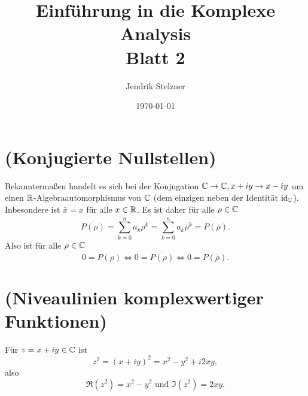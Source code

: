 \documentclass[a4paper,10pt]{article}
\title{\sc Einführung in die Komplexe Analysis \\ \Large Blatt 2}
\author{Jendrik Stelzner}
\date{\today}
\begin{document}
\maketitle





\section{(Konjugierte Nullstellen)}
Bekanntermaßen handelt es sich bei der Konjugation $\mathbb{C} \to \mathbb{C}, x+iy \to x-iy$ um einen $\mathbb{R}$-Algebraauto\-morph\-ismus von $\mathbb{C}$ (dem einzigen neben der Identität $\operatorname{id}_{\mathbb{C}}$). Inbesondere ist $\bar{x} = x$ für alle $x \in \mathbb{R}$. Es ist daher für alle $\rho \in \mathbb{C}$
\[
 \overline{P(\rho)} = \overline{\sum_{k=0}^n a_k \rho^k} = \sum_{k=0}^n a_k \bar{\rho}^k = P(\bar{\rho}).
\]
Also ist für alle $\rho \in \mathbb{C}$
\[
 0 = P(\rho) \Leftrightarrow 0 = \overline{P(\rho)} \Leftrightarrow 0 = P(\bar{\rho}).
\]





\section{(Niveaulinien komplexwertiger Funktionen)}
Für $z = x+iy \in \mathbb{C}$ ist
\[
 z^2 = (x+iy)^2 = x^2 - y^2 + i2xy,
\]
also
\[
 \Re\left(z^2\right) = x^2-y^2 \text{ und } \Im\left(z^2\right) = 2xy.
\]
\end{document}
